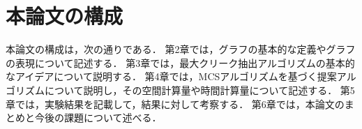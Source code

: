 \section{本論文の構成}
本論文の構成は，次の通りである．
第2章では，グラフの基本的な定義やグラフの表現について記述する．
第3章では，最大クリーク抽出アルゴリズムの基本的なアイデアについて説明する．
第4章では，MCSアルゴリズムを基づく提案アルゴリズムについて説明し，その空間計算量や時間計算量について記述する．
第5章では，実験結果を記載して，結果に対して考察する．
第6章では，本論文のまとめと今後の課題について述べる．
